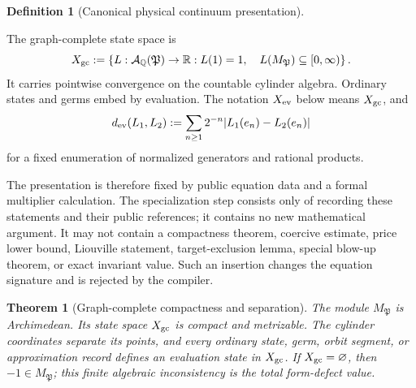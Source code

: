 \documentclass[11pt]{article}
\numberwithin{section}{part}
\theoremstyle{plain}
\newtheorem{theorem}{Theorem}[section]
\theoremstyle{definition}
\newtheorem{definition}[definition]{Definition}
\theoremstyle{remark}
\begin{document}
\begin{definition}[Canonical physical continuum presentation]
\begin{enumerate}[label=\textup{(P\arabic*)}]
The graph-complete state space is
\begin{equation}
 \label{eq:graph-complete-state-space}
 X_{\rm gc}:=
 \left\{L:\mathcal A_{\mathbb Q}(\mathfrak P)\to\mathbb R:
 L(1)=1,\quad L(M_{\mathfrak P})\subseteq[0,\infty)\right\}.
\end{equation}
It carries pointwise convergence on the countable cylinder algebra.
Ordinary states and germs embed by evaluation.  The notation \(X_{\rm ev}\)
below means \(X_{\rm gc}\), and
\begin{equation}
 \label{eq:canonical-evaluation-metric}
 d_{\rm ev}(L_1,L_2)
 :=\sum_{n\ge1}2^{-n}|L_1(e_n)-L_2(e_n)|
\end{equation}
for a fixed enumeration of normalized generators and rational products.
\end{enumerate}
The presentation is therefore fixed by public equation data and a formal
multiplier calculation.  The specialization step consists only of recording
these statements and their public references; it contains no new mathematical
argument.  It may not contain a compactness theorem, coercive
estimate, price lower bound, Liouville statement, target-exclusion lemma,
special blow-up theorem, or exact invariant value.  Such
an insertion changes the equation signature and is rejected by the compiler.
\end{definition}

\begin{theorem}[Graph-complete compactness and separation]
\label{thm:graph-complete-compactness}
The module \(M_{\mathfrak P}\) is Archimedean.  Its state space
\(X_{\rm gc}\) is compact and metrizable.  The cylinder coordinates separate
its points, and every ordinary state, germ, orbit segment, or approximation
record defines an evaluation state in \(X_{\rm gc}\).  If
\(X_{\rm gc}=\varnothing\), then \(-1\in M_{\mathfrak P}\); this finite
algebraic inconsistency is the total form-defect value.
\end{theorem}
\end{document}
